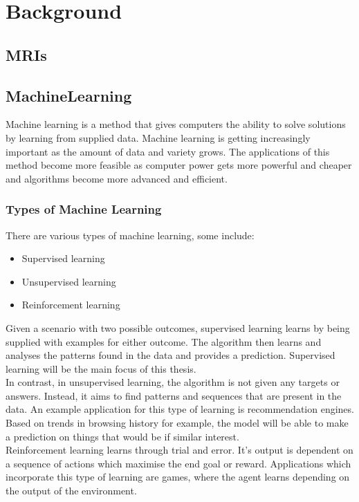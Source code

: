 \chapter{Background}
\section{MRIs}

\section{MachineLearning}
Machine learning is a method that gives computers the ability to solve solutions by learning from supplied data. Machine learning is getting increasingly important as the amount of data and variety grows. The applications of this method become more feasible as computer power gets more powerful and cheaper and algorithms become more advanced and efficient. 

\subsection{Types of Machine Learning}
There are various types of machine learning, some include:
\begin{itemize}
	\item Supervised learning
	\item Unsupervised learning
	\item Reinforcement learning
\end{itemize}

Given a scenario with two possible outcomes, supervised learning learns by being supplied with examples for either outcome. The algorithm then learns and analyses the patterns found in the data and provides a prediction. Supervised learning will be the main focus of this thesis.
\\[1\baselineskip]
In contrast, in unsupervised learning, the algorithm is not given any targets or answers. Instead, it aims to find patterns and sequences that are present in the data. An example application for this type of learning is recommendation engines. Based on trends in browsing history for example, the model will be able to make a prediction on things that would be if similar interest.
\\[1\baselineskip]
Reinforcement learning learns through trial and error. It's output is dependent on a sequence of actions which maximise the end goal or reward. Applications which incorporate this type of learning are games, where the agent learns depending on the output of the environment.
